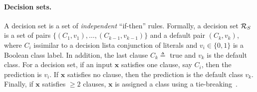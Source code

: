 \paragraph{Decision sets.} A decision set is a set of \textit{independent} ``if-then'' rules. Formally,  a decision set $ {\mathcal{R}}_S $ is a set of pairs $ \{(C_1, v_1), \dots, (C_{k-1}, v_{k-1})\}  $ and a  default pair $ (C_k, v_k) $, where $ C_i $ is\textemdash similar to a decision list\textemdash a conjunction of literals and $ v_i \in \{0,1\} $ is a Boolean class label. In addition, the last clause $ C_k \triangleq  $ true and $ v_k $ is the default class. For a  decision set, if an input $ \mathbf{x} $ satisfies one clause, say $ C_i $, then the prediction is $ v_i $. If $ \mathbf{x} $ satisfies no clause, then the prediction is the default class $ v_k $. Finally, if $ \mathbf{x} $ satisfies  $ \ge 2 $ clauses, $ \mathbf{x} $ is assigned a class using a tie-breaking~\cite{lakkaraju2016interpretable}. 



















